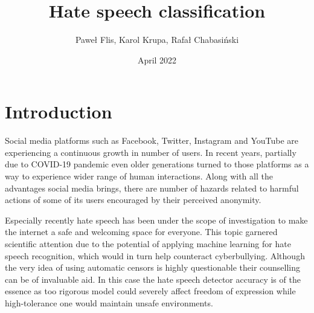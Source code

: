 \documentclass[a4paper]{article}
\title{Hate speech classification}
\author{Paweł Flis, Karol Krupa, Rafał Chabasiński}
\date{April 2022}
\begin{document}
\maketitle

\section{Introduction}
Social media platforms such as Facebook, Twitter, Instagram and YouTube are experiencing a continuous growth in number of users. In recent years, partially due to COVID-19 pandemic even older generations turned to those platforms as a way to experience wider range of human interactions. Along with all the advantages social media brings, there are number of hazards related to harmful actions of some of its users encouraged by their perceived anonymity.
\par
Especially recently hate speech has been under the scope of investigation to make the internet a safe and welcoming space for everyone. This topic garnered scientific attention due to the potential of applying machine learning for hate speech recognition, which would in turn help counteract cyberbullying. Although the very idea of using automatic censors is highly questionable their counselling can be of invaluable aid. In this case the hate speech detector accuracy is of the essence as too rigorous model could severely affect freedom of expression while high-tolerance one would maintain unsafe environments.
\end{document}
